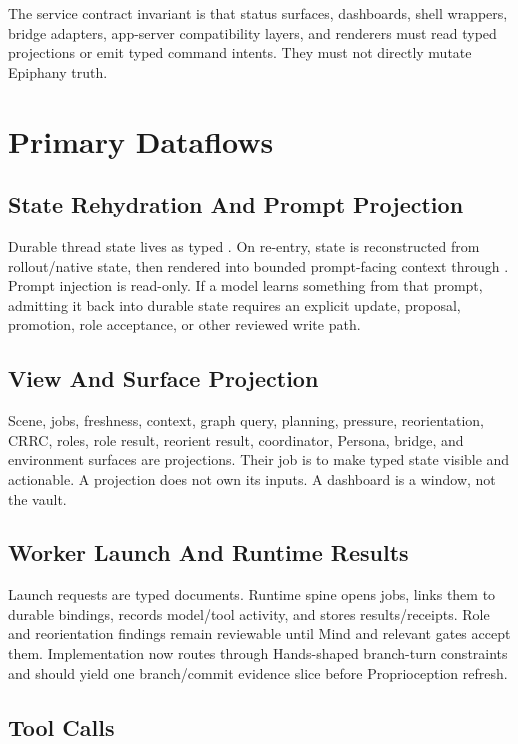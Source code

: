 \documentclass[11pt]{article}
\begin{document}
The service contract invariant is that status surfaces, dashboards, shell
wrappers, bridge adapters, app-server compatibility layers, and renderers must
read typed projections or emit typed command intents. They must not directly
mutate Epiphany truth.

\section{Primary Dataflows}

\subsection{State Rehydration And Prompt Projection}

Durable thread state lives as typed . On re-entry,
state is reconstructed from rollout/native state, then rendered into bounded
prompt-facing context through . Prompt injection is
read-only. If a model learns something from that prompt, admitting it back into
durable state requires an explicit update, proposal, promotion, role acceptance,
or other reviewed write path.

\subsection{View And Surface Projection}

Scene, jobs, freshness, context, graph query, planning, pressure, reorientation,
CRRC, roles, role result, reorient result, coordinator, Persona, bridge, and
environment surfaces are projections. Their job is to make typed state visible
and actionable. A projection does not own its inputs. A dashboard is a window,
not the vault.

\subsection{Worker Launch And Runtime Results}

Launch requests are typed documents. Runtime spine opens jobs, links them to
durable bindings, records model/tool activity, and stores results/receipts.
Role and reorientation findings remain reviewable until Mind and relevant gates
accept them. Implementation now routes through Hands-shaped branch-turn
constraints and should yield one branch/commit evidence slice before
Proprioception refresh.

\subsection{Tool Calls}
\end{document}
